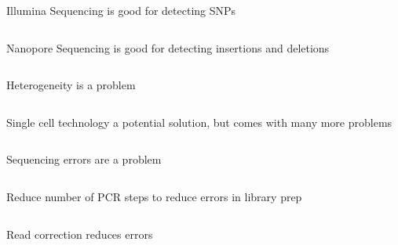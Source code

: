 \documentclass{beamer}
\begin{document}

\begin{frame}{Illumina Sequencing is good for detecting SNPs}
\begin{columns}
\end{columns}
\end{frame}

\begin{frame}{Nanopore Sequencing is good for detecting insertions and deletions}
\begin{columns}
\end{columns}
\end{frame}


\begin{frame}{Heterogeneity is a problem}
\begin{columns}
\end{columns}
\end{frame}

\begin{frame}{Single cell technology a potential solution, but comes with many more problems}
\begin{columns}
\end{columns}
\end{frame}

\begin{frame}{Sequencing errors are a problem}
\begin{columns}
\end{columns}
\end{frame}

\begin{frame}{Reduce number of PCR steps to reduce errors in library prep}
\begin{columns}
\end{columns}
\end{frame}

\begin{frame}{Read correction reduces errors}
\begin{columns}
\end{columns}
\end{frame}
\end{document}
